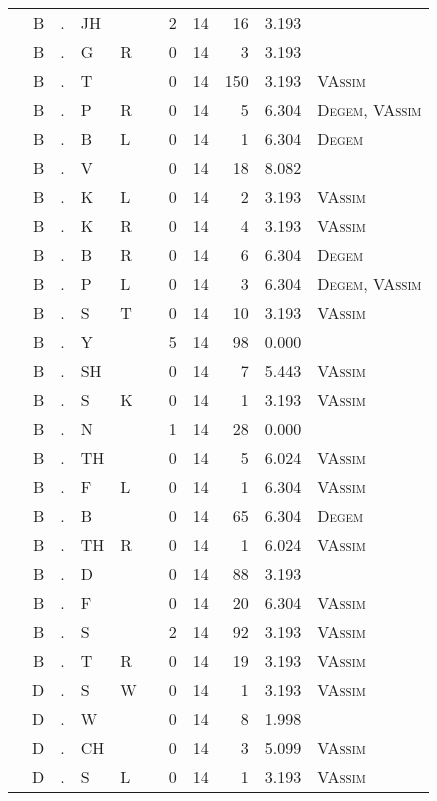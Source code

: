 \begin{longtable}{r@{ } r@{ } c@{ } l@{ } l@{ } l@{ } r r r r l }
 & B & . & JH &  &  & 2 & 14 & 16 & 3.193 &  \\
 & B & . & G & R &  & 0 & 14 & 3 & 3.193 &  \\
 & B & . & T &  &  & 0 & 14 & 150 & 3.193 & \textsc{VAssim} \\
 & B & . & P & R &  & 0 & 14 & 5 & 6.304 & \textsc{Degem}, \textsc{VAssim} \\
 & B & . & B & L &  & 0 & 14 & 1 & 6.304 & \textsc{Degem} \\
 & B & . & V &  &  & 0 & 14 & 18 & 8.082 &  \\
 & B & . & K & L &  & 0 & 14 & 2 & 3.193 & \textsc{VAssim} \\
 & B & . & K & R &  & 0 & 14 & 4 & 3.193 & \textsc{VAssim} \\
 & B & . & B & R &  & 0 & 14 & 6 & 6.304 & \textsc{Degem} \\
 & B & . & P & L &  & 0 & 14 & 3 & 6.304 & \textsc{Degem}, \textsc{VAssim} \\
 & B & . & S & T &  & 0 & 14 & 10 & 3.193 & \textsc{VAssim} \\
 & B & . & Y &  &  & 5 & 14 & 98 & 0.000 &  \\
 & B & . & SH &  &  & 0 & 14 & 7 & 5.443 & \textsc{VAssim} \\
 & B & . & S & K &  & 0 & 14 & 1 & 3.193 & \textsc{VAssim} \\
 & B & . & N &  &  & 1 & 14 & 28 & 0.000 &  \\
 & B & . & TH &  &  & 0 & 14 & 5 & 6.024 & \textsc{VAssim} \\
 & B & . & F & L &  & 0 & 14 & 1 & 6.304 & \textsc{VAssim} \\
 & B & . & B &  &  & 0 & 14 & 65 & 6.304 & \textsc{Degem} \\
 & B & . & TH & R &  & 0 & 14 & 1 & 6.024 & \textsc{VAssim} \\
 & B & . & D &  &  & 0 & 14 & 88 & 3.193 &  \\
 & B & . & F &  &  & 0 & 14 & 20 & 6.304 & \textsc{VAssim} \\
 & B & . & S &  &  & 2 & 14 & 92 & 3.193 & \textsc{VAssim} \\
 & B & . & T & R &  & 0 & 14 & 19 & 3.193 & \textsc{VAssim} \\
 & D & . & S & W &  & 0 & 14 & 1 & 3.193 & \textsc{VAssim} \\
 & D & . & W &  &  & 0 & 14 & 8 & 1.998 &  \\
 & D & . & CH &  &  & 0 & 14 & 3 & 5.099 & \textsc{VAssim} \\
 & D & . & S & L &  & 0 & 14 & 1 & 3.193 & \textsc{VAssim} \\

\end{longtable}
